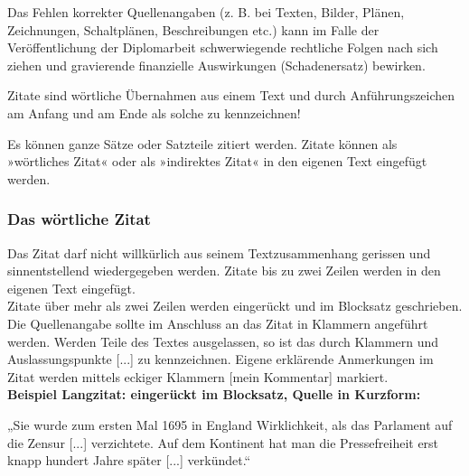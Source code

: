 \documentclass[a4paper, 12pt, xcolor=dvipsnames]{scrartcl}		%
\begin{document}
Das Fehlen korrekter Quellenangaben (z. B. bei Texten, Bilder, Plänen, Zeichnungen, Schaltplänen, Beschreibungen etc.)
kann im Falle der Veröffentlichung der Diplomarbeit schwerwiegende rechtliche Folgen nach sich ziehen und gravierende
finanzielle Auswirkungen (Schadenersatz) bewirken.\\

%
\begin{Merksatz}
Zitate sind wörtliche Übernahmen aus einem Text und durch Anführungszeichen am Anfang und am Ende als solche zu kennzeichnen!
\end{Merksatz}
%
Es können ganze Sätze oder Satzteile zitiert werden. Zitate können als »wörtliches Zitat« oder als »indirektes Zitat« in den eigenen Text eingefügt werden.

\subsubsection{Das wörtliche Zitat}
Das Zitat darf nicht willkürlich aus seinem Textzusammenhang gerissen und sinnentstellend wiedergegeben werden.
Zitate bis zu zwei Zeilen werden in den eigenen Text eingefügt.\\
Zitate über mehr als zwei Zeilen werden eingerückt und im Blocksatz geschrieben. Die Quellenangabe sollte im Anschluss an das Zitat in Klammern angeführt werden. Werden Teile des Textes ausgelassen, so ist das durch Klammern und Auslassungspunkte [...] zu kennzeichnen. Eigene erklärende Anmerkungen im Zitat werden mittels eckiger Klammern [mein Kommentar] markiert. \\

\textbf{Beispiel Langzitat: eingerückt im Blocksatz, Quelle in Kurzform:}\\
\vspace{-0.3cm}

\hspace{1.0cm}
    \begin{minipage}{0.935\textwidth}
	\linespread {1.25}%
„Sie wurde zum ersten Mal 1695 in England Wirklichkeit, als das Parlament auf die Zensur [...]
verzichtete. Auf dem Kontinent hat man die Pressefreiheit erst knapp hundert Jahre später
[...] verkündet.“ \cite[S~105]{11_Killinger}
    \end{minipage}
\vspace{0.5cm}
%
\end{document}
